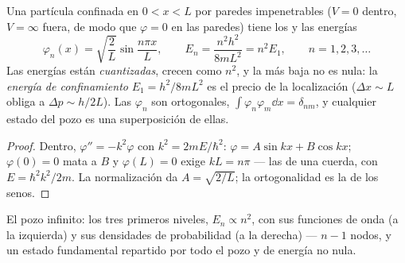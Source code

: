 \begin{proposition}\label{prop:b2:potential-wells-tunneling:infinite}
Una partícula confinada en $0 < x < L$ por paredes impenetrables ($V = 0$
dentro, $V = \infty$ fuera, de modo que $\varphi = 0$ en las paredes) tiene los
 y las energías
\[
\varphi_n(x) = \sqrt{\frac{2}{L}}\sin\frac{n\pi x}{L}, \qquad
E_n = \frac{n^2h^2}{8mL^2} = n^2E_1, \qquad n = 1, 2, 3, \dots
\]
Las energías están \emph{cuantizadas}, crecen
como $n^2$, y la más baja no es nula: la \emph{energía de
confinamiento} $E_1 = h^2/8mL^2$ es el precio de la
localización ($\Delta x \sim L$ obliga a $\Delta p \sim h/2L$). Las
$\varphi_n$ son ortogonales, $\int\varphi_n\varphi_m\dd x = \delta_{nm}$, y cualquier
estado del pozo es una superposición de ellas.
\end{proposition}

\begin{proof}
Dentro, $\varphi'' = -k^2\varphi$ con $k^2 = 2mE/\hbar^2$: $\varphi = A\sin kx
+ B\cos kx$; $\varphi(0) = 0$ mata a $B$ y $\varphi(L) = 0$ exige $kL = n\pi$
--- las  de una cuerda, con $E = \hbar^2k^2/2m$.
La normalización da $A = \sqrt{2/L}$; la ortogonalidad es la de los
senos.
\end{proof}

\begin{omfigure}

{\small El pozo infinito: los tres primeros niveles, $E_n \propto n^2$,
con sus funciones de onda (a la izquierda) y sus densidades de probabilidad (a la derecha) ---
$n - 1$ nodos, y un estado fundamental repartido por todo el pozo y
de energía no nula.}
\end{omfigure}

